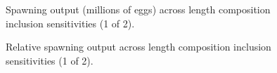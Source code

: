 \documentclass[
]{scrartcl}
\begin{document}
\begin{figure}


\caption{\label{fig-sens_lengths1_spout}Spawning output (millions of
eggs) across length composition inclusion sensitivities (1 of 2).}

\end{figure}%

\begin{figure}


\caption{\label{fig-sens_lengths1_status}Relative spawning output across
length composition inclusion sensitivities (1 of 2).}

\end{figure}%
\end{document}
